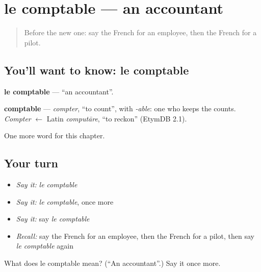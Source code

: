 \section[le comptable]{le comptable — an accountant}

\label{lesson:FR-C224-comptable}



\begin{quote}
Before the new one: say the French for an employee, then the French for a pilot.
\end{quote}

\subsection*{You'll want to know: le comptable}
\textbf{le comptable} — \textquotedblleft{}an accountant\textquotedblright{}.

\begin{cousinweb}
\textbf{comptable} — \emph{compter}, \textquotedblleft{}to count\textquotedblright{}, with \emph{-able}: one who keeps the counts. \emph{Compter} $\leftarrow$ Latin \emph{computāre}, \textquotedblleft{}to reckon\textquotedblright{} (EtymDB 2.1).
\end{cousinweb}

\begin{grammarlens}[title={What you've built}]
One more word for this chapter.
\end{grammarlens}

\subsection*{Your turn}
\begin{itemize}
\raggedright
  \item \emph{Say it:} \emph{le comptable}
  \item \emph{Say it:} \emph{le comptable}, once more
  \item \emph{Say it:} say \emph{le comptable}
  \item \emph{Recall:} say the French for an employee, then the French for a pilot, then say \emph{le comptable} again
\end{itemize}

\begin{tcolorbox}[breakable,colback=teal!4,colframe=teal!35!black,title={Before you move on}]
What does le comptable mean? (\textquotedblleft{}An accountant\textquotedblright{}.) Say it once more.
\end{tcolorbox}
